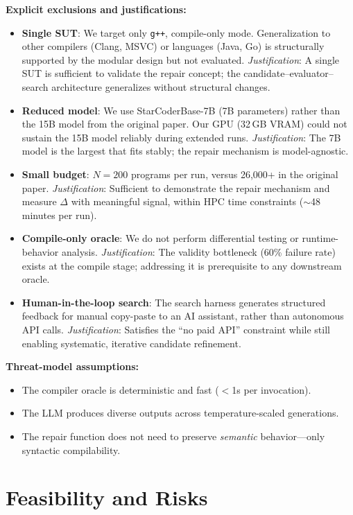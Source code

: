 \documentclass[conference]{IEEEtran}
\begin{document}
\textbf{Explicit exclusions and justifications:}
\begin{itemize}
    \item \textbf{Single SUT}: We target only \texttt{g++}, compile-only mode. Generalization to other compilers (Clang, MSVC) or languages (Java, Go) is structurally supported by the modular design but not evaluated. \emph{Justification}: A single SUT is sufficient to validate the repair concept; the candidate--evaluator--search architecture generalizes without structural changes.
    \item \textbf{Reduced model}: We use StarCoderBase-7B (7B parameters) rather than the 15B model from the original paper. Our GPU (32\,GB VRAM) could not sustain the 15B model reliably during extended runs. \emph{Justification}: The 7B model is the largest that fits stably; the repair mechanism is model-agnostic.
    \item \textbf{Small budget}: $N = 200$ programs per run, versus 26{,}000+ in the original paper. \emph{Justification}: Sufficient to demonstrate the repair mechanism and measure $\Delta$ with meaningful signal, within HPC time constraints ($\sim$48 minutes per run).
    \item \textbf{Compile-only oracle}: We do not perform differential testing or runtime-behavior analysis. \emph{Justification}: The validity bottleneck (60\% failure rate) exists at the compile stage; addressing it is prerequisite to any downstream oracle.
    \item \textbf{Human-in-the-loop search}: The search harness generates structured feedback for manual copy-paste to an AI assistant, rather than autonomous API calls. \emph{Justification}: Satisfies the ``no paid API'' constraint while still enabling systematic, iterative candidate refinement.
\end{itemize}

\textbf{Threat-model assumptions:}
\begin{itemize}
    \item The compiler oracle is deterministic and fast ($<$1s per invocation).
    \item The LLM produces diverse outputs across temperature-scaled generations.
    \item The repair function does not need to preserve \emph{semantic} behavior---only syntactic compilability.
\end{itemize}

\section{Feasibility and Risks}
\end{document}
